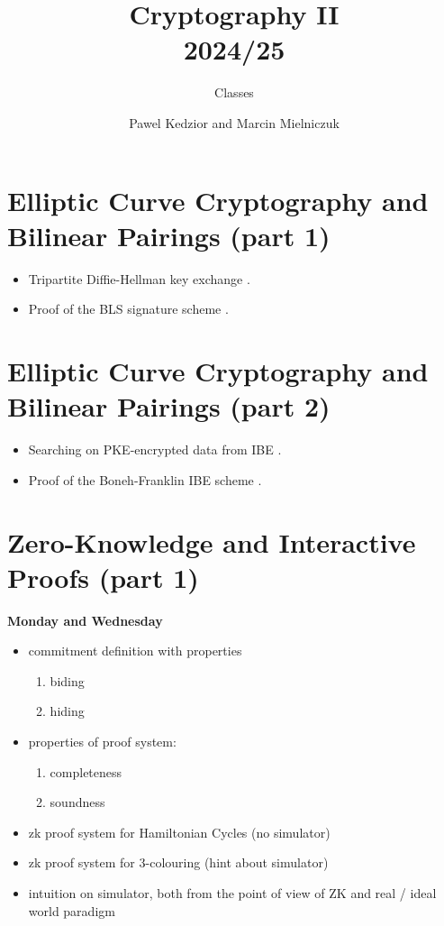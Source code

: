 \documentclass{llncs}
\title{Cryptography II\\ 2024/25}
\subtitle{Classes}
\author{Pawel Kedzior and Marcin Mielniczuk}
\institute{University of Warsaw}
\begin{document}
\maketitle

\section{Elliptic Curve Cryptography and Bilinear Pairings (part 1)}


\begin{itemize}
    \item Tripartite Diffie-Hellman key exchange \cite[Section 3.2]{tdh}.
    \item Proof of the BLS signature scheme \cite[Theorem 15.1]{Boneh2023}.
\end{itemize}


\section{Elliptic Curve Cryptography and Bilinear Pairings (part 2)}


\begin{itemize}
    \item Searching on PKE-encrypted data from IBE \cite[Section 15.6.4.3]{Boneh2023}.
    \item Proof of the Boneh-Franklin IBE scheme \cite[Theorem 15.6]{Boneh2023}.
\end{itemize}


\section{Zero-Knowledge and Interactive Proofs (part 1)}
\textbf{Monday and Wednesday}
\begin{itemize}
	\item commitment definition with properties
		\begin{enumerate}
			\item biding
			\item hiding
		\end{enumerate}
	\item properties of proof system:
		\begin{enumerate}
			\item completeness
			\item soundness
		\end{enumerate}
	\item zk proof system for Hamiltonian Cycles (no simulator)
	\item zk proof system for  3-colouring (hint about simulator)
	\item intuition on simulator, both from the point of view of ZK and real / ideal world paradigm
\end{itemize}
\end{document}

